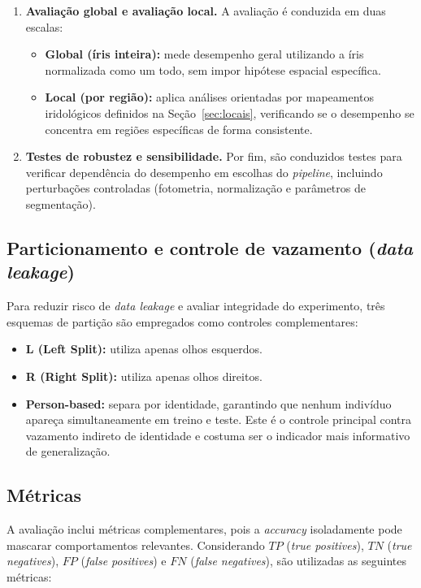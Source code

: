 \documentclass[12pt,a4paper]{article}
\begin{document}
\begin{enumerate}
    \item \textbf{Avaliação global e avaliação local.}
    A avaliação é conduzida em duas escalas:
    \begin{itemize}
        \item \textbf{Global (íris inteira):} mede desempenho geral utilizando a íris normalizada como um todo, sem impor hipótese espacial específica.
        \item \textbf{Local (por região):} aplica análises orientadas por mapeamentos iridológicos definidos na Seção~\ref{sec:locais}, verificando se o desempenho se concentra em regiões específicas de forma consistente.
    \end{itemize}

    \item \textbf{Testes de robustez e sensibilidade.}
    Por fim, são conduzidos testes para verificar dependência do desempenho em escolhas do \textit{pipeline}, incluindo perturbações controladas (fotometria, normalização e parâmetros de segmentação).
\end{enumerate}

\subsection{Particionamento e controle de vazamento (\textit{data leakage})}
Para reduzir risco de \textit{data leakage} e avaliar integridade do experimento, três esquemas de partição são empregados como controles complementares:

\begin{itemize}
    \item \textbf{L (Left Split):} utiliza apenas olhos esquerdos.
    \item \textbf{R (Right Split):} utiliza apenas olhos direitos.
    \item \textbf{Person-based:} separa por identidade, garantindo que nenhum indivíduo apareça simultaneamente em treino e teste. Este é o controle principal contra vazamento indireto de identidade e costuma ser o indicador mais informativo de generalização.
\end{itemize}

\subsection{Métricas}
A avaliação inclui métricas complementares, pois a \textit{accuracy} isoladamente pode mascarar comportamentos relevantes. Considerando \(TP\) (\textit{true positives}), \(TN\) (\textit{true negatives}), \(FP\) (\textit{false positives}) e \(FN\) (\textit{false negatives}), são utilizadas as seguintes métricas:
\end{document}
